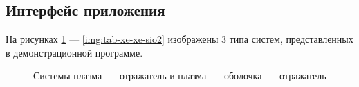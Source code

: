 
\begin{FixLineStretch}
\section{Интерфейс приложения}
\end{FixLineStretch}

На рисунках \ref{img:xe-and-xe-sio2} — \ref{img:tab-xe-xe-sio2} изображены 3 типа систем, представленных в демонстрационной программе.

\begin{figure}[H]
	\captionsetup{justification=centering}
	\caption{Системы плазма~— отражатель и плазма~— оболочка~— отражатель}
	\label{img:xe-and-xe-sio2}
\end{figure}


